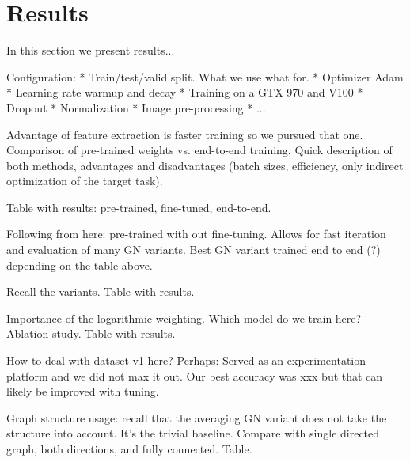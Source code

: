 \section{Results}

In this section we present results...

Configuration:
* Train/test/valid split. What we use what for.
* Optimizer Adam
* Learning rate warmup and decay
* Training on a GTX 970 and V100
* Dropout
* Normalization
* Image pre-processing
* ...

Advantage of feature extraction is faster training so we pursued that one. Comparison of pre-trained weights vs. end-to-end training. Quick description of both methods, advantages and disadvantages (batch sizes, efficiency, only indirect optimization of the target task).

Table with results: pre-trained, fine-tuned, end-to-end.

Following from here: pre-trained with out fine-tuning. Allows for fast iteration and evaluation of many GN variants. Best GN variant trained end to end (?) depending on the table above.

Recall the variants. Table with results.

Importance of the logarithmic weighting. Which model do we train here? Ablation study. Table with results.

How to deal with dataset v1 here? Perhaps: Served as an experimentation platform and we did not max it out. Our best accuracy was xxx but that can likely be improved with tuning.

Graph structure usage: recall that the averaging GN variant does not take the structure into account. It's the trivial baseline. Compare with single directed graph, both directions, and fully connected. Table.
